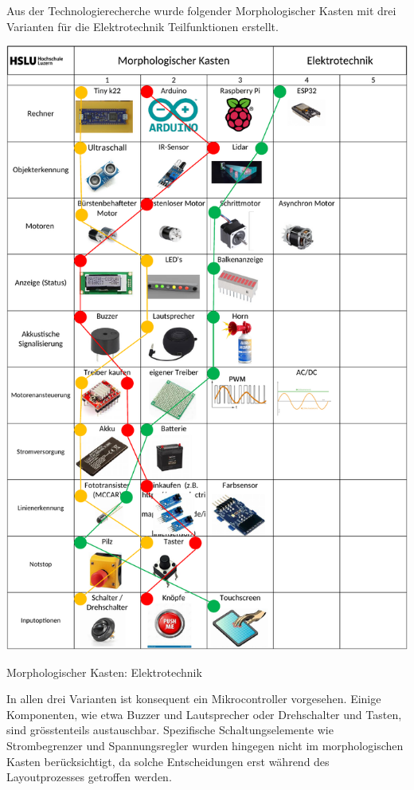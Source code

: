 Aus der Technologierecherche wurde folgender Morphologischer Kasten mit drei Varianten für die Elektrotechnik Teilfunktionen erstellt.

\begin{table}[H]
\centering
\includegraphics[width=\textwidth -5mm]{assets/MK_Elektrotechnik.pdf}
\caption{Morphologischer Kasten: Elektrotechnik}
\label{table:mk-elektrotechnik}
\end{table}

In allen drei Varianten ist konsequent ein Mikrocontroller vorgesehen. Einige Komponenten, wie etwa Buzzer und Lautsprecher oder Drehschalter und Tasten, sind grösstenteils austauschbar. Spezifische Schaltungselemente wie Strombegrenzer und Spannungsregler wurden hingegen nicht im morphologischen Kasten berücksichtigt, da solche Entscheidungen erst während des Layoutprozesses getroffen werden.


